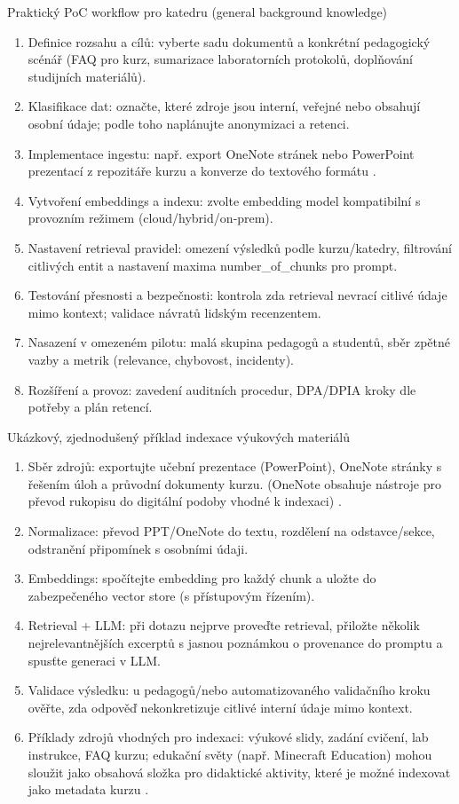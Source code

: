 Praktický PoC workflow pro katedru (general background knowledge)
\begin{enumerate}
  \item Definice rozsahu a cílů: vyberte sadu dokumentů a konkrétní pedagogický scénář (FAQ pro kurz, sumarizace laboratorních protokolů, doplňování studijních materiálů).
  \item Klasifikace dat: označte, které zdroje jsou interní, veřejné nebo obsahují osobní údaje; podle toho naplánujte anonymizaci a retenci.
  \item Implementace ingestu: např. export OneNote stránek nebo PowerPoint prezentací z repozitáře kurzu a konverze do textového formátu \cite{kb_ai_101_tipu_pdf_04e4a115_page_8_1,kb_ai_101_tipu_pdf_04e4a115_page_44_2}.
  \item Vytvoření embeddings a indexu: zvolte embedding model kompatibilní s provozním režimem (cloud/hybrid/on‑prem).
  \item Nastavení retrieval pravidel: omezení výsledků podle kurzu/katedry, filtrování citlivých entit a nastavení maxima number_of_chunks pro prompt.
  \item Testování přesnosti a bezpečnosti: kontrola zda retrieval nevrací citlivé údaje mimo kontext; validace návratů lidským recenzentem.
  \item Nasazení v omezeném pilotu: malá skupina pedagogů a studentů, sběr zpětné vazby a metrik (relevance, chybovost, incidenty).
  \item Rozšíření a provoz: zavedení auditních procedur, DPA/DPIA kroky dle potřeby a plán retencí.
\end{enumerate}

Ukázkový, zjednodušený příklad indexace výukových materiálů
\begin{enumerate}
  \item Sběr zdrojů: exportujte učební prezentace (PowerPoint), OneNote stránky s řešením úloh a průvodní dokumenty kurzu. (OneNote obsahuje nástroje pro převod rukopisu do digitální podoby vhodné k indexaci) \cite{kb_ai_101_tipu_pdf_04e4a115_page_8_1}.
  \item Normalizace: převod PPT/OneNote do textu, rozdělení na odstavce/sekce, odstranění připomínek s osobními údaji.
  \item Embeddings: spočítejte embedding pro každý chunk a uložte do zabezpečeného vector store (s přístupovým řízením).
  \item Retrieval + LLM: při dotazu nejprve proveďte retrieval, přiložte několik nejrelevantnějších excerptů s jasnou poznámkou o provenance do promptu a spusťte generaci v LLM.
  \item Validace výsledku: u pedagogů/nebo automatizovaného validačního kroku ověřte, zda odpověď nekonkretizuje citlivé interní údaje mimo kontext.
  \item Příklady zdrojů vhodných pro indexaci: výukové slidy, zadání cvičení, lab instrukce, FAQ kurzu; edukační světy (např. Minecraft Education) mohou sloužit jako obsahová složka pro didaktické aktivity, které je možné indexovat jako metadata kurzu \cite{kb_ai_101_tipu_pdf_04e4a115_page_15_2}.
\end{enumerate}

